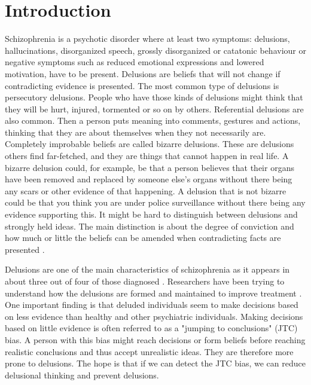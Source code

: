 \newpage
\chapter{Introduction}
\label{chapter:introduction}
Schizophrenia is a psychotic disorder where at least two symptoms: delusions, hallucinations, disorganized speech, grossly disorganized or catatonic behaviour or negative symptoms such as reduced emotional expressions and lowered motivation, have to be present. 
Delusions are beliefs that will not change if contradicting evidence is presented. The most common type of delusions is persecutory delusions. People who have those kinds of delusions might think that they will be hurt, injured, tormented or so on by others. Referential delusions are also common. Then a person puts meaning into comments, gestures and actions, thinking that they are about themselves when they not necessarily are. Completely improbable beliefs are called bizarre delusions. These are delusions others find far-fetched, and they are things that cannot happen in real life. A bizarre delusion could, for example, be that a person believes that their organs have been removed and replaced by someone else's organs without there being any scars or other evidence of that happening. A delusion that is not bizarre could be that you think you are under police surveillance without there being any evidence supporting this. It might be hard to distinguish between delusions and strongly held ideas. The main distinction is about the degree of conviction and how much or little the beliefs can be amended when contradicting facts are presented \citep{dsm-5}.


Delusions are one of the main characteristics of schizophrenia as it appears in about three out of four of those diagnosed \citep{garety2011}. Researchers have been trying to understand how the delusions are formed and maintained to improve treatment \citep{dudley_meta_2016}. One important finding is that deluded individuals seem to make decisions based on less evidence than healthy and other psychiatric individuals. Making decisions based on little evidence is often referred to as a "jumping to conclusions" (JTC) bias. A person with this bias might reach decisions or form beliefs before reaching realistic conclusions and thus accept unrealistic ideas. They are therefore more prone to delusions. The hope is that if we can detect the JTC bias, we can reduce delusional thinking and prevent delusions.

